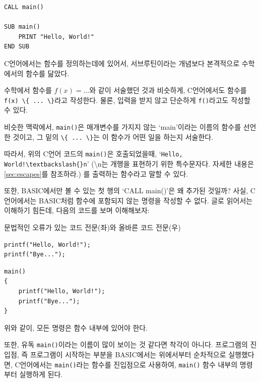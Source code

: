 \documentclass[a4paper,12pt]{book}
\newcommand{\V}[1]{\Verb|#1|}
\begin{document}
\begin{lstlisting}
CALL main()

SUB main()
    PRINT "Hello, World!"
END SUB
\end{lstlisting}

C언어에서는 함수를 정의하는데에 있어서,
서브루틴이라는 개념보다 본격적으로 수학에서의 함수를 닮았다.

수학에서 함수를 $f(x) = ...$와 같이 서술했던 것과 비슷하게,
C언어에서도 함수를 \V{f(x) \{ ... \}}라고 작성한다.
물론, 입력을 받지 않고 단순하게 \V{f()}라고도 작성할 수 있다.

비슷한 맥락에서, \V{main()}은 매개변수를 가지지 않는 `main'이라는 이름의 함수를 선언한 것이고,
그 밑의 \V{\{ ... \}}는 이 함수가 어떤 일을 하는지 서술한다.

따라서, 위의 C언어 코드의 \V{main()}은 호출되었을때,
`\V{Hello, World!\textbackslash{}n}'
(\textbackslash{}n는 개행을 표현하기 위한 특수문자다.
자세한 내용은 \autoref{sec:escapes}를 참조하라.)
를 출력하는 함수라고 말할 수 있다.

또한, BASIC에서만 볼 수 있는 첫 행의 `CALL main()'은 왜 추가된 것일까?
사실, C언어에서는 BASIC처럼 함수에 포함되지 않는 명령을 작성할 수 없다.
글로 읽어서는 이해하기 힘든데, 다음의 코드를 보며 이해해보자:

\begin{center}

    \centering
    
    문법적인 오류가 있는 코드 전문(좌)와 올바른 코드 전문(우)

    \begin{minipage}{0.45\textwidth}
        \begin{lstlisting}
printf("Hello, World!");
printf("Bye...");
        \end{lstlisting}
    \end{minipage}
    \hfill
    \begin{minipage}{0.45\textwidth}
        \begin{lstlisting}
main()
{
    printf("Hello, World!");
    printf("Bye...");
}
        \end{lstlisting}
    \end{minipage}

\end{center}

위와 같이, 모든 명령은 함수 내부에 있어야 한다.

또한, 유독 \V{main()}이라는 이름이 많이 보이는 것 같다면 착각이 아니다.
프로그램의 진입점, 즉 프로그램이 시작하는 부분을 BASIC에서는 위에서부터
순차적으로 실행했다면, C언어에서는 \V{main()}라는 함수를 진입점으로 사용하여,
\V{main()} 함수 내부의 명령부터 실행하게 된다.
\end{document}
